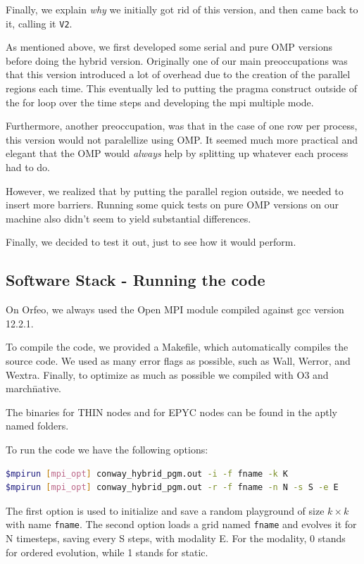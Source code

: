 \documentclass{report}
\begin{document}
Finally, we explain \textit{why} we initially got rid of this version, and then 
came back to it, calling it \texttt{V2}.

As mentioned above, we first developed some serial and pure OMP versions before 
doing the hybrid version. Originally one of our main preoccupations was that this 
version introduced a lot of overhead due to the creation of the parallel regions 
each time. This eventually led to putting the pragma construct outside of the 
for loop over the time steps and developing the mpi multiple mode. 

Furthermore, another preoccupation, was that in the case of one row per process, 
this version would not paralellize using OMP. It seemed much more practical and 
elegant that the OMP would \textit{always} help by splitting up whatever each 
process had to do. 

However, we realized that by putting the parallel region outside, we needed to 
insert more barriers. Running some quick tests on pure OMP versions on our machine 
also didn't seem to yield substantial differences.

Finally, we decided to test it out, just to see how it would perform.

\subsection{Software Stack - Running the code}
On Orfeo, we always used the Open MPI module compiled against gcc version 12.2.1. 

To compile the code, we provided a Makefile, which automatically compiles the 
source code. We used as many error flags as possible, such as \-Wall, \-Werror, and 
\-Wextra. Finally, to optimize as much as possible we compiled with \-O3 and 
\-march\=native. 

The binaries for THIN nodes and for EPYC nodes can be found in the aptly named  
folders.

To run the code we have the following options:

\begin{lstlisting}[language=bash]
$mpirun [mpi_opt] conway_hybrid_pgm.out -i -f fname -k K 
$mpirun [mpi_opt] conway_hybrid_pgm.out -r -f fname -n N -s S -e E
\end{lstlisting}
The first option is used to initialize and save a random playground of size 
$k \times k$ with name \texttt{fname}.
The second option loads a grid named \texttt{fname} and evolves it for N 
timesteps, saving every S steps, with modality E. For the modality, 0 stands 
for ordered evolution, while 1 stands for static.
\end{document}
